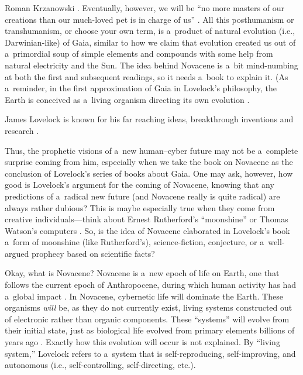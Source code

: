 \begin{newrevengenv}{Roman Krzanowski}
\parencite[][p.30]{lovelock_novacene_2019}. %
 Eventually, however, we will be ``no more masters of our creations than our much-loved pet is in charge of us'' 
\parencite[][p.119]{lovelock_novacene_2019}. %
 All this posthumanism or transhumanism, or choose your own term, is a~product of natural evolution (i.e., Darwinian-like) of Gaia, similar to how we claim that evolution created us out of a~primordial soup of simple elements and compounds with some help from natural electricity and the Sun. The idea behind Novacene is a~bit mind-numbing at both the first and subsequent readings, so it needs a~book to explain it. (As a~reminder, in the first approximation of Gaia in Lovelock's philosophy, the Earth is conceived as a~living organism directing its own evolution 
\parencites[e.g.][pp.12–17; 70]{lovelock_novacene_2019}.%


James Lovelock is known for his far reaching ideas, breakthrough inventions
\parencite[e.g., the electron capture detector (ECD)][p.38]{lovelock_novacene_2019} %
and research
\parencite[e.g., chlorofluorocarbons or CFC presence][p.38]{wylie_mindfck_2019}.%

Thus, the prophetic visions of a~new human–cyber future may not be a~complete surprise coming from him, especially when we take the book on Novacene as the conclusion of Lovelock's series of books about Gaia. One may ask, however, how good is Lovelock's argument for the coming of Novacene, knowing that any predictions of a~radical new future (and Novacene really is quite radical) are always rather dubious? This is maybe especially true when they come from creative individuals---think about Ernest Rutherford's ``moonshine'' or Thomas Watson's computers
\parencites[see][]{strohmeyer_7_2008}[or][]{singer_hindsight_2021}. %
 So, is the idea of Novacene elaborated in Lovelock's book a~form of moonshine (like Rutherford's), science-fiction, conjecture, or a~well-argued prophecy based on scientific facts?

Okay, what is Novacene? Novacene is a~new epoch of life on Earth, one that follows the current epoch of Anthropocene, during which human activity has had a~global impact
\parencite*[][pp.33–44]{lovelock_novacene_2019}. %
 In Novacene, cybernetic life will dominate the Earth. These organisms \textit{will} be, as they do not currently exist, living systems constructed out of electronic rather than organic components. These ``systems'' will evolve from their initial state, just as biological life evolved from primary elements billions of years ago 
\parencite*[][p.27]{lovelock_novacene_2019}. %
 Exactly how this evolution will occur is not explained. By ``living system,'' Lovelock refers to a~system that is self-reproducing, self-improving, and autonomous (i.e., self-controlling, self-directing, etc.).


\end{newrevengenv}
